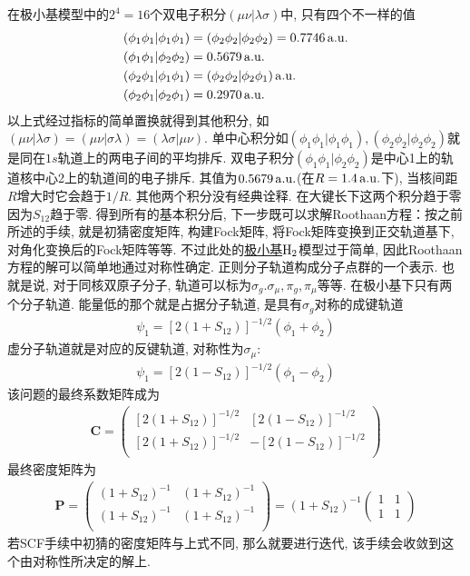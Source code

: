 在极小基模型中的$2^4=16$个双电子积分$(\mu\nu|\lambda\sigma)$中, 
只有四个不一样的值
\begin{equation}
	\begin{split}
		(\phi_1\phi_1|\phi_1\phi_1) & = (\phi_2\phi_2|\phi_2\phi_2) = 0.7746\,\mathrm{a.u.}\\
		(\phi_1\phi_1|\phi_2\phi_2) & =0.5679\,\mathrm{a.u.}\\
		(\phi_2\phi_1|\phi_1\phi_1) & =(\phi_2\phi_2|\phi_2\phi_1)\,\mathrm{a.u.}\\
		(\phi_2\phi_1|\phi_2\phi_1) & =0.2970\,\mathrm{a.u.}
	\end{split}
\end{equation}
以上式经过指标的简单置换就得到其他积分, 
如$(\mu\nu|\lambda\sigma)=(\mu\nu|\sigma\lambda)=(\lambda\sigma|\mu\nu)$. 
单中心积分如$(\phi_1\phi_1|\phi_1\phi_1),(\phi_2\phi_2|\phi_2\phi_2)$就是同在$1s$轨道上的两电子间的平均排斥. 
双电子积分$(\phi_1\phi_1|\phi_2\phi_2)$是中心1上的轨道核中心2上的轨道间的电子排斥. 
其值为$0.5679\,\mathrm{a.u.}$(在$R=1.4\,\mathrm{a.u.}$下), 
当核间距$R$增大时它会趋于$1/R$. 
其他两个积分没有经典诠释. 
在大键长下这两个积分趋于零因为$S_{12}$趋于零. 
得到所有的基本积分后, 
下一步既可以求解Roothaan方程：按之前所述的手续, 
就是初猜密度矩阵, 
构建Fock矩阵, 
将Fock矩阵变换到正交轨道基下, 
对角化变换后的Fock矩阵等等. 
不过此处的\underline{极小基$\mathrm{H}_2$}模型过于简单, 
因此Roothaan方程的解可以简单地通过对称性确定. 
正则分子轨道构成分子点群的一个表示. 
也就是说, 
对于同核双原子分子, 
轨道可以标为$\sigma_g.\sigma_\mu,\pi_g,\pi_\mu$等等. 
在极小基下只有两个分子轨道. 
能量低的那个就是占据分子轨道, 
是具有$\sigma_g$对称的成键轨道
\begin{align}
	\psi_1 = [2(1+S_{12})]^{-1/2}(\phi_1+\phi_2)
\end{align}
虚分子轨道就是对应的反键轨道, 
对称性为$\sigma_\mu$:
\begin{align}
	\psi_1 = [2(1-S_{12})]^{-1/2}(\phi_1-\phi_2)
\end{align}
该问题的最终系数矩阵成为
\begin{align}
	\mathbf{C}=
	\begin{pmatrix}
		[2(1+S_{12})]^{-1/2} & [2(1-S_{12})]^{-1/2}\\
		[2(1+S_{12})]^{-1/2} & -[2(1-S_{12})]^{-1/2}\\
	\end{pmatrix}
\end{align}
最终密度矩阵为
\begin{align}
	\mathbf{P}=
	\begin{pmatrix}
		(1+S_{12})^{-1} & (1+S_{12})^{-1} \\
		(1+S_{12})^{-1} & (1+S_{12})^{-1} \\
	\end{pmatrix}
	=(1+S_{12})^{-1} 
	\begin{pmatrix}
		1&1\\1&1
	\end{pmatrix}
\end{align}
若SCF手续中初猜的密度矩阵与上式不同, 
那么就要进行迭代, 
该手续会收敛到这个由对称性所决定的解上.

